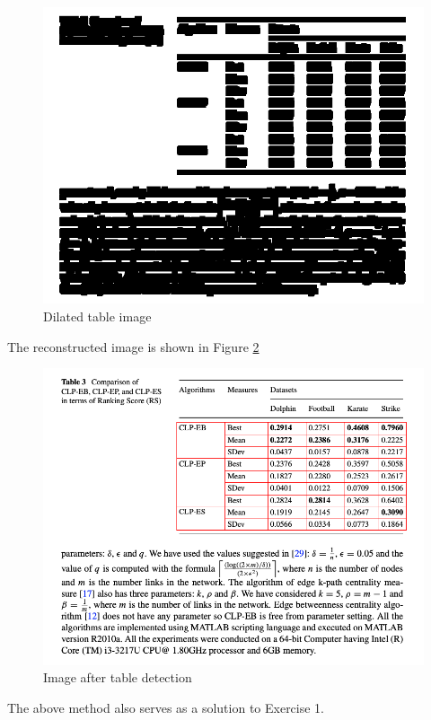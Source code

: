 \begin{figure}[ht]
  \begin{center}
  \includegraphics[width=12cm]{img/pre.png}
  \caption{Dilated table image}
  \label{fig:dilate}
  \end{center}
\end{figure}

The reconstructed image is shown in Figure \ref{fig:line3}

\begin{figure}[ht]
  \begin{center}
  \includegraphics[width=12cm]{img/out.png}
  \caption{Image after table detection}
  \label{fig:line3}
  \end{center}
\end{figure}

The above method also serves as a solution to Exercise 1.


